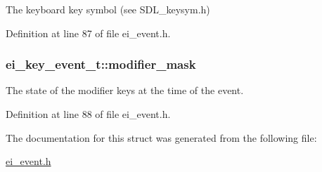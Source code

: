 The keyboard key symbol (see S\+D\+L\+\_\+keysym.\+h) 



Definition at line 87 of file ei\+\_\+event.\+h.

\hypertarget{structei__key__event__t_a35e4dc6d788b9fdd4eeedf716662afab}{
\subsubsection[{modifier\+\_\+mask}]{ ei\+\_\+key\+\_\+event\+\_\+t\+::modifier\+\_\+mask}}\label{structei__key__event__t_a35e4dc6d788b9fdd4eeedf716662afab}


The state of the modifier keys at the time of the event. 



Definition at line 88 of file ei\+\_\+event.\+h.



The documentation for this struct was generated from the following file\+:\begin{DoxyCompactItemize}
\item 
\hyperlink{ei__event_8h}{ei\+\_\+event.\+h}\end{DoxyCompactItemize}
